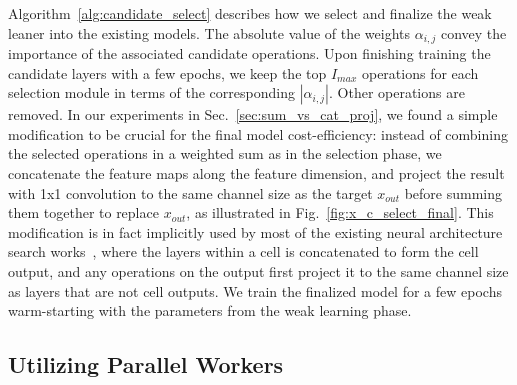 Algorithm~\ref{alg:candidate_select} describes how we select and finalize the weak leaner into the existing models. 
The absolute value of the weights $\alpha_{i,j}$ convey the importance of the associated candidate operations. Upon finishing training the candidate layers with a few epochs, we keep the top $I_{max}$ operations for each selection module in terms of the corresponding $| \alpha _{i,j} |$. 
Other operations are removed. In our experiments in Sec.~\ref{sec:sum_vs_cat_proj}, we found a simple modification to be crucial for the final model cost-efficiency: instead of combining the selected operations in a weighted sum as in the selection phase, we concatenate the feature maps along the feature dimension, and project the result with 1x1 convolution to the same channel size as the target $x_{out}$ before summing them together to replace $x_{out}$, as illustrated in Fig.~\ref{fig:x_c_select_final}. This modification is in fact implicitly used by most of the existing neural architecture search works~\citep{NASCell,Pham2018EfficientNA}, where the layers within a cell is concatenated to form the cell output, and any operations on the output first project it to the same channel size as layers that are not cell outputs. We train the finalized model for a few epochs warm-starting with the parameters from the weak learning phase. 






\subsection{Utilizing Parallel Workers}
\label{sec:parent_choice}



